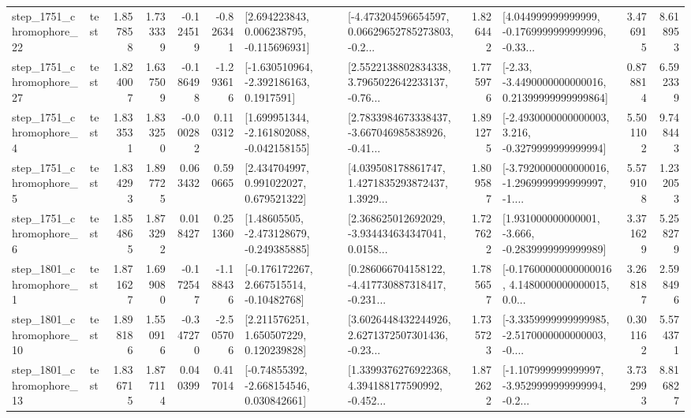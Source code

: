 \begin{tabular}{llrrrrllrlrr}
 step\_1751\_chromophore\_22 &      test &      1.857858 &    1.733339 &     -0.124519 & -0.826341 &    [2.694223843, 0.006238795, -0.115696931] &  [-4.473204596654597, 0.06629652785273803, -0.2... &       1.826442 &  [4.044999999999999, -0.1769999999999996, -0.33... &            3.476915 &          8.618953 \\
 step\_1751\_chromophore\_27 &      test &      1.824007 &    1.637509 &     -0.186498 & -1.293616 &     [-1.630510964, -2.392186163, 0.1917591] &  [2.5522138802834338, 3.7965022642233137, -0.76... &       1.775976 &  [-2.33, -3.4490000000000016, 0.21399999999999864] &            0.878814 &          6.592339 \\
  step\_1751\_chromophore\_4 &      test &      1.833531 &    1.833250 &     -0.000282 &  0.110312 &   [1.699951344, -2.161802088, -0.042158155] &  [2.7833984673338437, -3.667046985838926, -0.41... &       1.891275 &  [-2.4930000000000003, 3.216, -0.3279999999999994] &            5.501102 &          9.748443 \\
  step\_1751\_chromophore\_5 &      test &      1.834293 &    1.897725 &      0.063432 &  0.590665 &     [2.434704997, 0.991022027, 0.679521322] &  [4.039508178861747, 1.4271835293872437, 1.3929... &       1.809587 &  [-3.7920000000000016, -1.2969999999999997, -1.... &            5.579108 &          1.232053 \\
  step\_1751\_chromophore\_6 &      test &      1.854865 &    1.873292 &      0.018427 &  0.251360 &    [1.48605505, -2.473128679, -0.249385885] &  [2.368625012692029, -3.934434634347041, 0.0158... &       1.727622 &   [1.931000000000001, -3.666, -0.2839999999999989] &            3.371629 &          5.258279 \\
  step\_1801\_chromophore\_1 &      test &      1.871627 &    1.699080 &     -0.172547 & -1.188436 &    [-0.176172267, 2.667515514, -0.10482768] &  [0.286066704158122, -4.417730887318417, -0.231... &       1.785657 &  [-0.17600000000000016, 4.1480000000000015, 0.0... &            3.268187 &          2.598496 \\
 step\_1801\_chromophore\_10 &      test &      1.898186 &    1.550916 &     -0.347270 & -2.505706 &     [2.211576251, 1.650507229, 0.120239828] &  [3.6026448432244926, 2.6271372507301436, -0.23... &       1.735723 &  [-3.3359999999999985, -2.5170000000000003, -0.... &            0.301162 &          5.574371 \\
 step\_1801\_chromophore\_13 &      test &      1.836715 &    1.877114 &      0.040399 &  0.417014 &    [-0.74855392, -2.668154546, 0.030842661] &  [1.3399376276922368, 4.394188177590992, -0.452... &       1.872622 &  [-1.107999999999997, -3.9529999999999994, -0.2... &            3.732993 &          8.816827 \\

\end{tabular}
